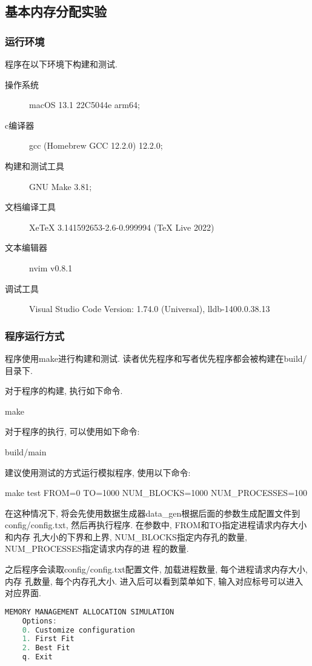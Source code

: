 \subsection{基本内存分配实验}
\subsubsection{运行环境}
程序在以下环境下构建和测试.
\begin{description}
    \item[操作系统] macOS 13.1 22C5044e arm64;
    \item[c编译器] gcc (Homebrew GCC 12.2.0) 12.2.0;
    \item[构建和测试工具] GNU Make 3.81;
    \item[文档编译工具] XeTeX 3.141592653-2.6-0.999994 (TeX Live 2022)
    \item[文本编辑器] nvim v0.8.1
    \item[调试工具] Visual Studio Code Version: 1.74.0 (Universal),
        lldb-1400.0.38.13
\end{description}

\subsubsection{程序运行方式}
程序使用make进行构建和测试. 读者优先程序和写者优先程序都会被构建在build/目录下.\par
对于程序的构建, 执行如下命令.
\begin{code}
    make
\end{code}

对于程序的执行, 可以使用如下命令:
\begin{code}
    build/main
\end{code}

建议使用测试的方式运行模拟程序, 使用以下命令:
\begin{code}
    make test FROM=0 TO=1000 NUM_BLOCKS=1000 NUM_PROCESSES=100
\end{code}
在这种情况下, 将会先使用数据生成器data\_gen根据后面的参数生成配置文件到
config/config.txt, 然后再执行程序. 在参数中, FROM和TO指定进程请求内存大小和内存
孔大小的下界和上界, NUM\_BLOCKS指定内存孔的数量, NUM\_PROCESSES指定请求内存的进
程的数量.\par

之后程序会读取config/config.txt配置文件, 加载进程数量, 每个进程请求内存大小, 内存
孔数量, 每个内存孔大小. 进入后可以看到菜单如下, 输入对应标号可以进入对应界面.

\begin{lstlisting}[language=c++]
    MEMORY MANAGEMENT ALLOCATION SIMULATION
    Options:
    0. Customize configuration
    1. First Fit
    2. Best Fit
    q. Exit
\end{lstlisting}

